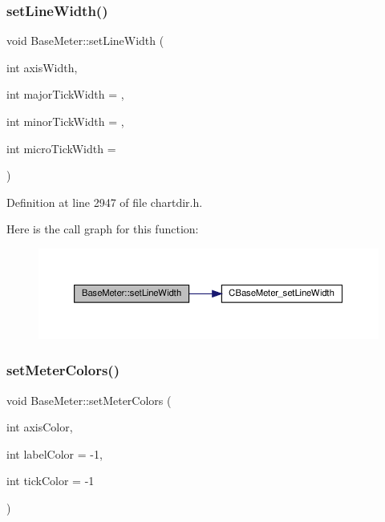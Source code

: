 \subsubsection{\texorpdfstring{set\+Line\+Width()}{setLineWidth()}}
{\footnotesize\ttfamily void Base\+Meter\+::set\+Line\+Width (\begin{DoxyParamCaption}\item[{int}]{axis\+Width,  }\item[{int}]{major\+Tick\+Width = {},  }\item[{int}]{minor\+Tick\+Width = {},  }\item[{int}]{micro\+Tick\+Width = {} }\end{DoxyParamCaption})\hspace{0.3cm}{\ttfamily [inline]}}



Definition at line 2947 of file chartdir.\+h.

Here is the call graph for this function\+:
\nopagebreak
\begin{figure}[H]
\begin{center}
\leavevmode
\includegraphics[width=350pt]{class_base_meter_a356cadb2071ff42164974e5809840f5f_cgraph}
\end{center}
\end{figure}
\mbox{\label{class_base_meter_ab84e7d42596803b75cd15bd721ae96f1}} 
\subsubsection{\texorpdfstring{set\+Meter\+Colors()}{setMeterColors()}}
{\footnotesize\ttfamily void Base\+Meter\+::set\+Meter\+Colors (\begin{DoxyParamCaption}\item[{int}]{axis\+Color,  }\item[{int}]{label\+Color = {\ttfamily -\/1},  }\item[{int}]{tick\+Color = {\ttfamily -\/1} }\end{DoxyParamCaption})\hspace{0.3cm}{\ttfamily [inline]}}



